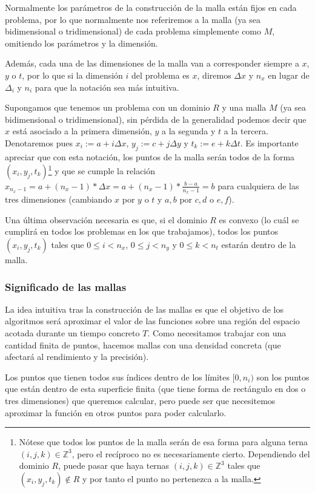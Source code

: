 Normalmente los parámetros de la construcción de la malla están fijos en cada problema, por lo que normalmente nos referiremos a la malla (ya sea bidimensional o tridimensional) de cada problema simplemente como $M$, omitiendo los parámetros y la dimensión.

Además, cada una de las dimensiones de la malla van a corresponder siempre a $x$, $y$ o $t$, por lo que si la dimensión $i$ del problema es $x$, diremos $\Delta x$ y $n_x$ en lugar de $\Delta_i$ y $n_i$ para que la notación sea más intuitiva.

Supongamos que tenemos un problema con un dominio $R$ y una malla $M$ (ya sea bidimensional o tridimensional), sin pérdida de la generalidad podemos decir que $x$ está asociado a la primera dimensión, $y$ a la segunda y $t$ a la tercera. Denotaremos pues $x_i:=a+i\Delta x$, $y_j:=c+j\Delta y$ y $t_k:=e+k\Delta t$. Es importante apreciar que con esta notación, los puntos de la malla serán todos de la forma $(x_i,y_j,t_k)$\footnote{Nótese que todos los puntos de la malla serán de esa forma para alguna terna $(i,j,k)\in\mathbb{Z}^3$, pero el recíproco no es necesariamente cierto. Dependiendo del dominio $R$, puede pasar que haya ternas $(i,j,k)\in\mathbb{Z}^3$ tales que $(x_i,y_j,t_k)\notin R$ y por tanto el punto no pertenezca a la malla.} y que se cumple la relación $x_{n_x-1}=a+(n_x-1)*\Delta x = a + (n_x-1)*\frac{b-a}{n_x-1}=b$ para cualquiera de las tres dimensiones (cambiando $x$ por $y$ o $t$ y $a,b$ por $c,d$ o $e,f$).

Una última observación necesaria es que, si el dominio $R$ es convexo (lo cuál se cumplirá en todos los problemas en los que trabajamos), todos los puntos $(x_i,y_j,t_k)$ tales que $0\leq i<n_x$, $0\leq j<n_y$ y $0\leq k<n_t$ estarán dentro de la malla.

\subsubsection{Significado de las mallas}
La idea intuitiva tras la construcción de las mallas es que el objetivo de los algoritmos será aproximar el valor de las funciones sobre una región del espacio acotada durante un tiempo concreto $T$. Como necesitamos trabajar con una cantidad finita de puntos, hacemos mallas con una densidad concreta (que afectará al rendimiento y la precisión).

Los puntos que tienen todos sus índices dentro de los límites $[0,n_i)$ son los puntos que están dentro de esta superficie finita (que tiene forma de rectángulo en dos o tres dimensiones) que queremos calcular, pero puede ser que necesitemos aproximar la función en otros puntos para poder calcularlo.

